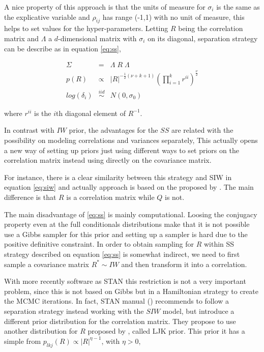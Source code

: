 \documentclass{article}
\begin{document}
A nice property of this approach is that the units of measure for $\sigma_i$ is the same as the explicative variable and $\rho_{ij}$ has range (-1,1) with no unit of measure, this helps to set values for the hyper-parameters.  Letting $R$ being the correlation matrix and $\Lambda$ a $d$-dimensional matrix with $\sigma_{i}$ on its diagonal, separation strategy can be describe as in equation \ref{eq:ss},  

\begin{eqnarray}
\nonumber \Sigma &=& \Lambda \; R \; \Lambda \\ 
\nonumber  p(R) &\propto& |R|^{-\frac{1}{2}(\nu+k+1) }  (\prod_{i=1}^k r^{ii}) ^{\frac{\nu}{2}} \\
log(\delta_i) &\stackrel{iid} \sim& N(0, \sigma_{0})
\label{eq:ss}
\end{eqnarray} 

where $r^{ii}$ is the $i$th diagonal element of $R^{-1}$. 

In contrast with $IW$ prior, the advantages for the $SS$ are related with the possibility on modeling correlations and variances separately, This actually opens a new way of setting up priors just using different ways to set priors on the correlation matrix instead using directly on the covariance matrix. 

For instance, there is a clear similarity between this strategy and  SIW in equation \ref{eq:siw} and actually \cite{SIW2008} approach is based on the proposed by \cite{barnard2000}. The main difference is that $R$ is a correlation matrix while $Q$ is not. 

The main disadvantage of \ref{eq:ss} is mainly computational. Loosing the conjugacy property even at the full conditionals distributions make that it is not possible use a Gibbs sampler for this prior and setting up a sampler is hard due to the positive definitive constraint. In order to obtain sampling for $R$ within SS strategy described on equation \ref{eq:ss} is somewhat indirect, we need to first sample a covariance matrix $R^* \sim IW$ and then transform it  into a correlation. 

With more recently software as STAN \cite{stan2014} this restriction is not a very important problem, since this is not based on Gibbs but in a Hamiltonian strategy to create the MCMC iterations.  In fact, STAN manual (\cite{stanmanual2014}) recommends to follow a separation strategy instead working with the $SIW$ model, but introduce a different prior distribution for the correlation matrix. They propose to use another distribution for $R$ proposed by \cite{lewandowski2009generating}, called LJK prior.   This prior it has a simple from $p_{lkj}(R) \propto |R|^{\eta-1}$, with $\eta > 0$, 
\end{document}

